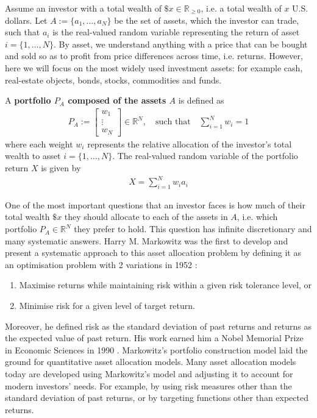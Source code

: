 
Assume an investor with a total wealth of $\$x \in \mathbb{R}_{\geq 0}$, i.e. a total wealth of $x$ U.S. dollars. Let $A := \{a_1, \dots, a_N \}$ be the set of assets, which the investor can trade, such that $a_i$ is the real-valued random variable representing the return of asset $i = \{ 1, \dots, N \}$. By asset, we understand anything with a price that can be bought and sold so as to profit from price differences across time, i.e. returns. However, here we will focus on the most widely used investment assets: for example cash, real-estate objects, bonds, stocks, commodities and funds.

\begin{definition}
    A \textbf{portfolio $P_A$ composed of the assets $A$} is defined as
    \begin{align*}
        P_A := \begin{bmatrix} w_1 \\ \vdots \\ w_N \end{bmatrix} \in \mathbb{R}^N, \quad \text{such that} \quad \sum_{i=1}^N w_i = 1
    \end{align*}
    where each weight $w_i$ represents the relative allocation of the investor's total wealth to asset $i = \{ 1, \dots, N \}$. The real-valued random variable of the portfolio return $X$ is given by
    \begin{align*}
        X = \sum_{i=1}^N w_i a_i
    \end{align*}
\end{definition}

One of the most important questions that an investor faces is how much of their total wealth $\$x$ they should allocate to each of the assets in $A$, i.e. which portfolio $P_A \in \mathbb{R}^N$ they prefer to hold. This question has infinite discretionary and many systematic answers. Harry M. Markowitz was the first to develop and present a systematic approach to this asset allocation problem by defining it as an optimisation problem with 2 variations in 1952 \cite{markowitzorg}:
\begin{enumerate}
    \item Maximise returns while maintaining risk within a given risk tolerance level, or
    \item Minimise risk for a given level of target return.
\end{enumerate}
Moreover, he defined risk as the standard deviation of past returns and returns as the expected value of past return. His work earned him a Nobel Memorial Prize in Economic Sciences in 1990 \cite{markowitznobelprize}. Markowitz's portfolio construction model laid the ground for quantitative asset allocation models. Many asset allocation models today are developed using Markowitz's model and adjusting it to account for modern investors' needs. For example, by using risk measures other than the standard deviation of past returns, or by targeting functions other than expected returns.

